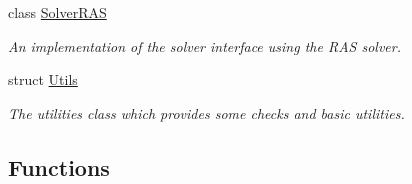 \begin{DoxyCompactItemize}
class \hyperlink{classschwz_1_1SolverRAS}{Solver\+R\+AS}
\begin{DoxyCompactList}\small\item\em An implementation of the solver interface using the R\+AS solver. \end{DoxyCompactList}\item 
struct \hyperlink{structschwz_1_1Utils}{Utils}
\begin{DoxyCompactList}\small\item\em The utilities class which provides some checks and basic utilities. \end{DoxyCompactList}\end{DoxyCompactItemize}
\subsection*{Functions}
